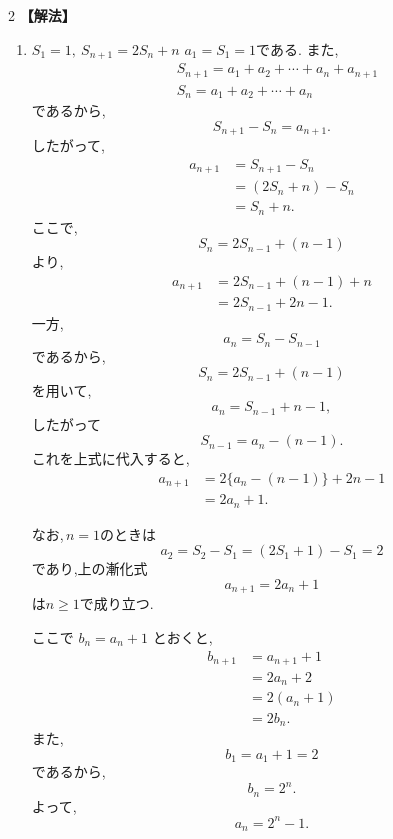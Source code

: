 \documentclass[dvipdfmx,a4paper,11pt,fleqn,openany]{jsbook}
\begin{document}
\begin{multicols*}{2}
      \noindent\textbf{【解法】}
      \begin{enumerate}[label=(\arabic*),parsep=3pt]
      \item $\displaystyle S_1=1,\ S_{n+1}=2S_n+n$
          $a_1=S_1=1$である.
          また,
          \begin{align*}
            &S_{n+1}=a_1+a_2+\cdots+a_n+a_{n+1}\\
            &S_n=a_1+a_2+\cdots+a_n
          \end{align*}
          であるから,
          \[
            S_{n+1}-S_n=a_{n+1}.
          \]
          したがって,
          \begin{align*}
            a_{n+1}
              &=S_{n+1}-S_n\\
              &=(2S_n+n)-S_n\\
              &=S_n+n.
          \end{align*}
          ここで,
          \[
            S_n=2S_{n-1}+(n-1)
          \]
          より,
          \begin{align*}
            a_{n+1}
              &=2S_{n-1}+(n-1)+n\\
              &=2S_{n-1}+2n-1.
          \end{align*}
          一方,
          \[
            a_n=S_n-S_{n-1}
          \]
          であるから,
          \[
            S_n=2S_{n-1}+(n-1)
          \]
          を用いて,
          \[
            a_n=S_{n-1}+n-1,
          \]
          したがって
          \[
            S_{n-1}=a_n-(n-1).
          \]
          これを上式に代入すると,
          \begin{align*}
            a_{n+1}
              &=2\{a_n-(n-1)\}+2n-1\\
              &=2a_n+1.
          \end{align*}

          なお,\,$n=1$のときは
          \[
            a_2=S_2-S_1=(2S_1+1)-S_1=2
          \]
          であり,上の漸化式
          \[
            a_{n+1}=2a_n+1
          \]
          は$n\ge1$で成り立つ.

          ここで $b_n=a_n+1$ とおくと,
          \begin{align*}
            b_{n+1}
              &=a_{n+1}+1\\
              &=2a_n+2\\
              &=2(a_n+1)\\
              &=2b_n.
          \end{align*}
          また,
          \[
            b_1=a_1+1=2
          \]
          であるから,
          \[
            b_n=2^n.
          \]
          よって,
          \[
            a_n=2^n-1.
          \]
      \end{enumerate}


\end{multicols*}
\end{document}
